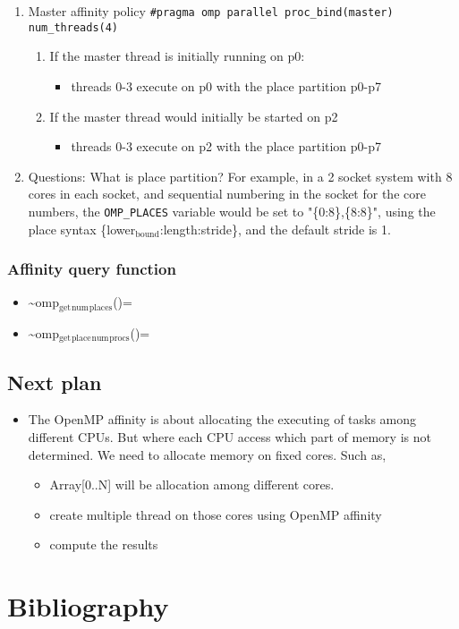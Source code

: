\documentclass[11pt]{article}
\begin{document}
\begin{enumerate}
\item Master affinity policy
\label{sec-9-6-2-3}
\texttt{\#pragma omp parallel proc\_bind(master) num\_threads(4)}
\begin{enumerate}
\item If the master thread is initially running on p0:
\begin{itemize}
\item threads 0-3 execute on p0 with the place partition p0-p7
\end{itemize}
\item If the master thread would initially be started on p2
\begin{itemize}
\item threads 0-3 execute on p2 with the place partition p0-p7
\end{itemize}
\end{enumerate}
\item Questions:
\label{sec-9-6-2-4}
What is place partition? 
For example, in a 2 socket system with 8 cores in each socket, and sequential numbering in the socket for the core numbers, the \texttt{OMP\_PLACES} variable would be set to
"\{0:8\},\{8:8\}", using the place syntax \{lower$_{\text{bound}}$:length:stride\}, and the default stride is 1.
\end{enumerate}

\subsubsection{Affinity query function}
\label{sec-9-6-3}
\begin{itemize}
\item \textasciitilde{}omp$_{\text{get}}$$_{\text{num}}$$_{\text{places}}$()=
\item \textasciitilde{}omp$_{\text{get}}$$_{\text{place}}$$_{\text{num}}$$_{\text{procs}}$()=
\end{itemize}
\subsection{Next plan}
\label{sec-9-7}
\begin{itemize}
\item The OpenMP affinity is about allocating the executing of tasks among different CPUs. But where each CPU access which part of memory is not determined. We need to allocate memory on fixed cores. Such as,

\begin{itemize}
\item Array[0..N] will be allocation among different cores.
\item create multiple thread on those cores using OpenMP affinity
\item compute the results
\end{itemize}
\end{itemize}

\section{Bibliography}
\label{sec-10}


\end{document}
